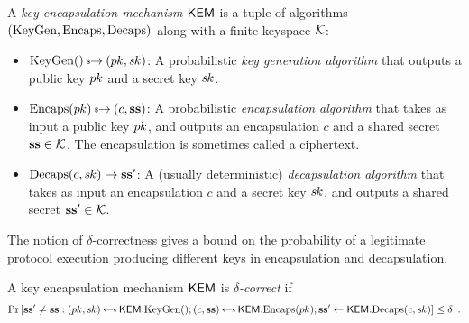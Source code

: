 \begin{definition}
A \emph{key encapsulation mechanism} $\textsf{\upshape\mdseries KEM}$ is a tuple of algorithms
$(\textrm{\upshape\mdseries KeyGen},\textrm{\upshape\mdseries Encaps},\textrm{\upshape\mdseries Decaps})$ along with a finite keyspace $\mathcal{K}$:
\begin{itemize}
\item $\KeyGen() \tor (\pk, \sk)$: A probabilistic \emph{key generation algorithm} that outputs a public key $p\mkern-0.5muk$ and a secret key $s\mkern-1muk$.
\item $\Encaps(\pk) \tor (c, \ssk)$: A probabilistic \emph{encapsulation algorithm} that takes as input a public key $p\mkern-0.5muk$, and outputs an encapsulation $c$ and a shared secret $\mathbf{s}\mathbf{s} \in \mathcal{K}$.  The encapsulation is sometimes called a ciphertext.
\item $\textrm{\upshape\mdseries Decaps}(c, s\mkern-1muk) \to \mathbf{s}\mathbf{s}'$: A (usually deterministic) \emph{decapsulation algorithm} that takes as input an encapsulation $c$ and a secret key $s\mkern-1muk$, and outputs a shared secret $\mathbf{s}\mathbf{s}' \in \mathcal{K}$.
\end{itemize}
\end{definition}

The notion of $\delta$-correctness gives a bound on the probability of a legitimate protocol execution producing different keys in encapsulation and decapsulation.

\begin{definition}
A key encapsulation mechanism $\textsf{\upshape\mdseries KEM}$ is \emph{$\delta$-correct} if
\[ \Pr\left[ \ssk' \ne \ssk : (\pk, \sk) \getsr \KEM.\KeyGen(); (c, \ssk) \getsr \KEM.\Encaps(\pk);  \ssk' \gets \KEM.\Decaps(c, \sk) \right] \le \delta\enspace . \]
\end{definition}






